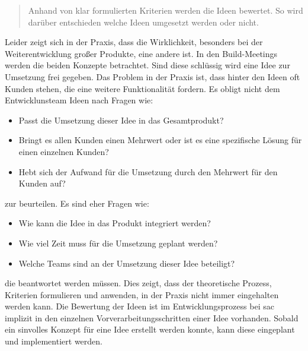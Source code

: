 \begin{quote}Anhand von klar formulierten Kriterien werden die Ideen bewertet. So wird darüber entschieden welche Ideen umgesetzt werden oder nicht.\end{quote}

Leider zeigt sich in der Praxis, dass die Wirklichkeit, besonders bei der Weiterentwicklung großer Produkte, eine andere ist. 
In den Build-Meetings werden die beiden Konzepte betrachtet. Sind diese schlüssig wird eine Idee zur Umsetzung frei gegeben. 
Das Problem in der Praxis ist, dass hinter den Ideen oft Kunden stehen, die eine weitere Funktionalität fordern. Es obligt nicht 
dem Entwicklunsteam Ideen nach Fragen wie: 
\begin{itemize}
    \item Passt die Umsetzung dieser Idee in das Gesamtprodukt?
    \item Bringt es allen Kunden einen Mehrwert oder ist es eine spezifische Lösung für einen einzelnen Kunden?
    \item Hebt sich der Aufwand für die Umsetzung durch den Mehrwert für den Kunden auf?
\end{itemize}
zur beurteilen. Es sind eher Fragen wie: 
\begin{itemize}
    \item Wie kann die Idee in das Produkt integriert werden?
    \item Wie viel Zeit muss für die Umsetzung geplant werden? 
    \item Welche Teams sind an der Umsetzung dieser Idee beteiligt?
\end{itemize}
die beantwortet werden müssen. 
Dies zeigt, dass der theoretische Prozess, Kriterien formulieren und anwenden, in der Praxis nicht immer eingehalten werden kann.
Die Bewertung der Ideen ist im Entwicklungsprozess bei \ac{sac} implizit in den einzelnen Vorverarbeitungsschritten einer Idee vorhanden.
Sobald ein sinvolles Konzept für eine Idee erstellt werden konnte, kann diese eingeplant und implementiert werden.